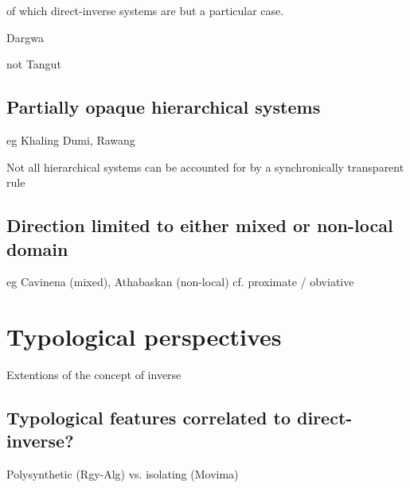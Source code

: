 \documentclass[twoside,a4paper,11pt]{article}
\begin{document}
%
%


of which direct-inverse systems are but a particular case.

Dargwa \citet{sumbatova03}

not Tangut  \citet{jacques09tangutverb}
\subsection{Partially opaque hierarchical systems} \label{sec:opaque}
eg Khaling \citet{jacques12khaling}
Dumi, Rawang

Not all hierarchical systems can be accounted for by a synchronically transparent rule
\subsection{Direction limited to either mixed or non-local domain}

eg Cavinena (mixed), Athabaskan (non-local) cf. proximate / obviative


\section{Typological perspectives}

Extentions of the concept of inverse
\subsection{Typological features correlated to direct-inverse?}
Polysynthetic (Rgy-Alg) vs. isolating (Movima)
\end{document}
